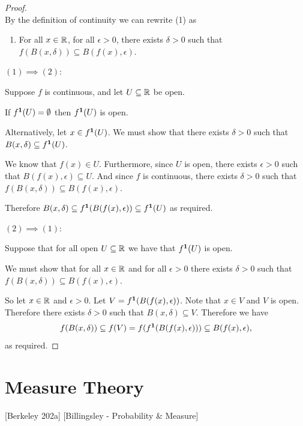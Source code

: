 \begin{proof}~\\

  By the definition of continuity we can rewrite (1) as
  \begin{enumerate}
  \item For all $x \in \mathbb{R}$, for all $\epsilon > 0$, there exists $\delta > 0$ such that
    $f(B(x, \delta)) \subseteq B(f(x), \epsilon)$.
  \end{enumerate}\hspace{0pt}

  $(1) \implies (2)$:

  Suppose $f$ is continuous, and let $U \subseteq \mathbb{R}$ be open.

  If $f^{\mathbf 1}(U) = \emptyset$ then $f^{\mathbf 1}(U)$ is open.

  Alternatively, let $x \in f^{\mathbf 1}(U)$. We must show that there exists $\delta > 0$ such that
  $B(x, \delta) \subseteq f^{\mathbf 1}(U)$.

  We know that $f(x) \in U$. Furthermore, since $U$ is open, there exists $\epsilon > 0$ such that
  $B(f(x), \epsilon) \subseteq U$. And since $f$ is continuous, there exists $\delta > 0$ such that
  $f(B(x, \delta)) \subseteq B(f(x), \epsilon)$.

  Therefore $B(x, \delta) \subseteq f^{\mathbf 1}(B(f(x), \epsilon)) \subseteq f^{\mathbf 1}(U)$ as required.

  $(2) \implies (1)$:

  Suppose that for all open $U \subseteq \mathbb{R}$ we have that $f^{\mathbf 1}(U)$ is open.

  We must show that for all $x \in \mathbb{R}$ and for all $\epsilon > 0$ there exists $\delta > 0$ such
  that $f(B(x, \delta)) \subseteq B(f(x), \epsilon)$.

  So let $x \in \mathbb{R}$ and $\epsilon > 0$. Let $V = f^{\mathbf 1}(B(f(x), \epsilon))$.  Note that $x \in V$ and
  $V$ is open. Therefore there exists $\delta > 0$ such that $B(x, \delta) \subseteq V$. Therefore
  we have
  \begin{align*}
    f(B(x, \delta))
    \subseteq f(V)
    = f(f^{\mathbf 1}(B(f(x), \epsilon)))
    \subseteq B(f(x), \epsilon),
  \end{align*}
  as required.
\end{proof}
\section{Measure Theory}
[Berkeley 202a]
[Billingsley - Probability \& Measure]


